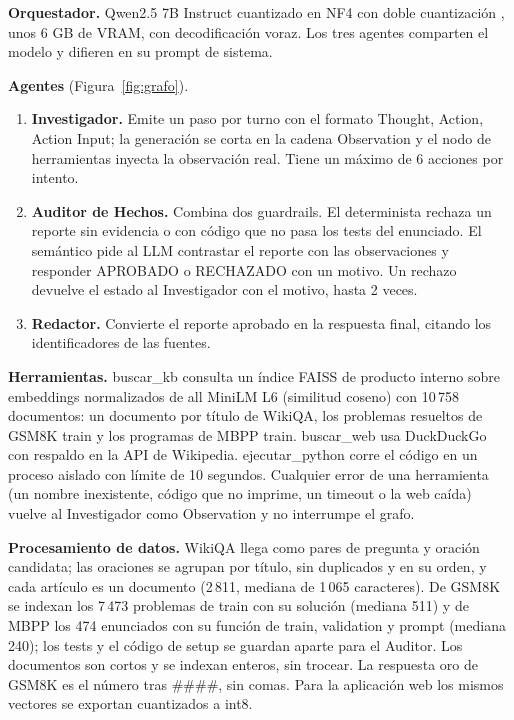 \documentclass[10pt,a4paper,twocolumn]{article}
\begin{document}
\textbf{Orquestador.} Qwen2.5 7B Instruct \cite{qwen2025} cuantizado en NF4 con doble cuantización \cite{dettmers2023qlora}, unos 6 GB de VRAM, con decodificación voraz. Los tres agentes comparten el modelo y difieren en su prompt de sistema.

\textbf{Agentes} (Figura~\ref{fig:grafo}).
\begin{enumerate}
\item \textbf{Investigador.} Emite un paso por turno con el formato Thought, Action, Action Input; la generación se corta en la cadena Observation y el nodo de herramientas inyecta la observación real. Tiene un máximo de 6 acciones por intento.
\item \textbf{Auditor de Hechos.} Combina dos guardrails. El determinista rechaza un reporte sin evidencia o con código que no pasa los tests del enunciado. El semántico pide al LLM contrastar el reporte con las observaciones y responder APROBADO o RECHAZADO con un motivo. Un rechazo devuelve el estado al Investigador con el motivo, hasta 2 veces.
\item \textbf{Redactor.} Convierte el reporte aprobado en la respuesta final, citando los identificadores de las fuentes.
\end{enumerate}

\textbf{Herramientas.} buscar\_kb consulta un índice FAISS de producto interno sobre embeddings normalizados de all MiniLM L6 \cite{reimers2019sbert} (similitud coseno) con 10\,758 documentos: un documento por título de WikiQA, los problemas resueltos de GSM8K train y los programas de MBPP train. buscar\_web usa DuckDuckGo con respaldo en la API de Wikipedia. ejecutar\_python corre el código en un proceso aislado con límite de 10 segundos. Cualquier error de una herramienta (un nombre inexistente, código que no imprime, un timeout o la web caída) vuelve al Investigador como Observation y no interrumpe el grafo.

\textbf{Procesamiento de datos.} WikiQA llega como pares de pregunta y oración candidata; las oraciones se agrupan por título, sin duplicados y en su orden, y cada artículo es un documento (2\,811, mediana de 1\,065 caracteres). De GSM8K se indexan los 7\,473 problemas de train con su solución (mediana 511) y de MBPP los 474 enunciados con su función de train, validation y prompt (mediana 240); los tests y el código de setup se guardan aparte para el Auditor. Los documentos son cortos y se indexan enteros, sin trocear. La respuesta oro de GSM8K es el número tras \#\#\#\#, sin comas. Para la aplicación web los mismos vectores se exportan cuantizados a int8.
\end{document}
